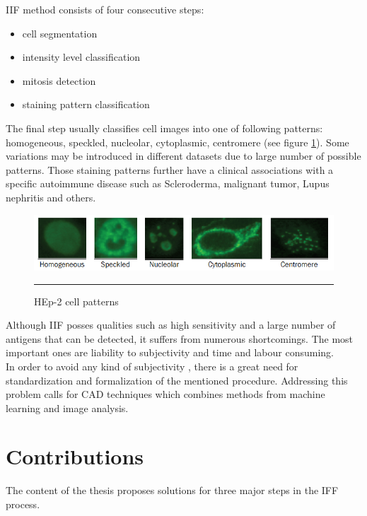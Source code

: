 IIF method consists of four consecutive steps:
\begin{itemize}
	\item cell segmentation
 	\item intensity level classification
 	\item mitosis detection
 	\item staining pattern classification
\end{itemize}

The final step usually classifies cell images into one of following patterns: homogeneous, speckled, nucleolar, cytoplasmic, centromere (see figure \ref{fig:CellExamples}). Some variations may be introduced in different datasets due to large number of possible patterns. Those staining patterns further have a clinical associations with a specific autoimmune disease such as Scleroderma, malignant tumor, Lupus nephritis and others. \\

\begin{figure}[htbp]
	\centering
	\includegraphics[scale=0.7]{Figures/introduction/cell_examples}
	\rule{35em}{0.5pt}
	\caption[Cell examples]{HEp-2 cell patterns}
	\label{fig:CellExamples}

\end{figure}

Although IIF posses qualities such as high sensitivity and a large number of antigens that can be detected, it suffers from numerous shortcomings. The most important ones are liability to subjectivity and time and labour consuming. \\

In order to avoid any kind of subjectivity , there is a great need for standardization and formalization of the mentioned procedure. Addressing this problem calls for CAD techniques which combines methods from machine learning and image analysis.

\section{Contributions}

The content of the thesis proposes solutions for three major steps in the IFF process. \\

